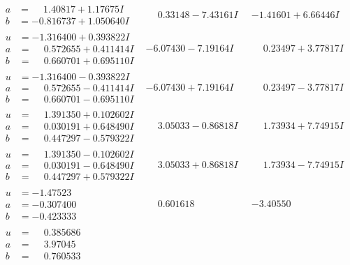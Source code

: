 \documentclass[1p]{elsarticle_modified}
\theoremstyle{definition}
\begin{document}
$$\begin{array}{c|c|c}
\begin{aligned}
a &= \phantom{-}1.40817 + 1.17675 I \\
b &= -0.816737 + 1.050640 I\end{aligned}
 & \phantom{-}0.33148 - 7.43161 I & -1.41601 + 6.66446 I \\ \hline\begin{aligned}
u &= -1.316400 + 0.393822 I \\
a &= \phantom{-}0.572655 + 0.411414 I \\
b &= \phantom{-}0.660701 + 0.695110 I\end{aligned}
 & -6.07430 - 7.19164 I & \phantom{-}0.23497 + 3.77817 I \\ \hline\begin{aligned}
u &= -1.316400 - 0.393822 I \\
a &= \phantom{-}0.572655 - 0.411414 I \\
b &= \phantom{-}0.660701 - 0.695110 I\end{aligned}
 & -6.07430 + 7.19164 I & \phantom{-}0.23497 - 3.77817 I \\ \hline\begin{aligned}
u &= \phantom{-}1.391350 + 0.102602 I \\
a &= \phantom{-}0.030191 + 0.648490 I \\
b &= \phantom{-}0.447297 - 0.579322 I\end{aligned}
 & \phantom{-}3.05033 - 0.86818 I & \phantom{-}1.73934 + 7.74915 I \\ \hline\begin{aligned}
u &= \phantom{-}1.391350 - 0.102602 I \\
a &= \phantom{-}0.030191 - 0.648490 I \\
b &= \phantom{-}0.447297 + 0.579322 I\end{aligned}
 & \phantom{-}3.05033 + 0.86818 I & \phantom{-}1.73934 - 7.74915 I \\ \hline\begin{aligned}
u &= -1.47523\phantom{ +0.000000I} \\
a &= -0.307400\phantom{ +0.000000I} \\
b &= -0.423333\phantom{ +0.000000I}\end{aligned}
 & \phantom{-}0.601618\phantom{ +0.000000I} & -3.40550\phantom{ +0.000000I} \\ \hline\begin{aligned}
u &= \phantom{-}0.385686\phantom{ +0.000000I} \\
a &= \phantom{-}3.97045\phantom{ +0.000000I} \\
b &= \phantom{-}0.760533\phantom{ +0.000000I}\end{aligned}

\end{array}$$
\end{document}
